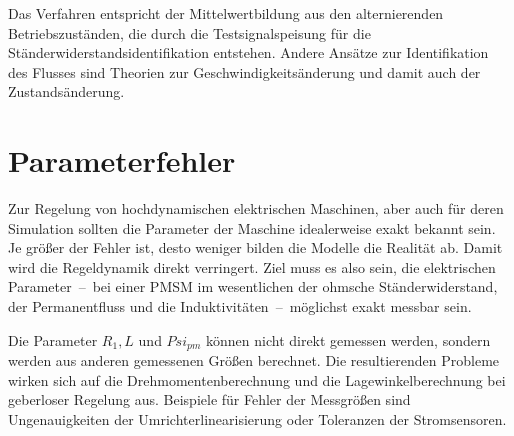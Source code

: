 \documentclass[conference,twocolumn]{IEEEtran}
\begin{document}
Das Verfahren entspricht der Mittelwertbildung aus den alternierenden Betriebszuständen, die durch die Testsignalspeisung für die Ständerwiderstandsidentifikation entstehen.
Andere Ansätze zur Identifikation des Flusses sind Theorien zur Geschwindigkeitsänderung und damit auch der Zustandsänderung.

\section{Parameterfehler}\label{sec:parameterfehler}

Zur Regelung von hochdynamischen elektrischen Maschinen, aber auch für deren Simulation sollten die Parameter der Maschine idealerweise exakt bekannt sein.
Je größer der Fehler ist, desto weniger bilden die Modelle die Realität ab.
Damit wird die Regeldynamik direkt verringert.
Ziel muss es also sein, die elektrischen Parameter~--~bei einer PMSM im wesentlichen der ohmsche Ständerwiderstand, der Permanentfluss und die Induktivitäten~--~möglichst exakt messbar sein.

Die Parameter $R_{1}, L$ und $Psi_{pm}$ können nicht direkt gemessen werden, sondern werden aus anderen gemessenen Größen berechnet.
Die resultierenden Probleme wirken sich auf die Drehmomentenberechnung und die Lagewinkelberechnung bei geberloser Regelung aus.
Beispiele für Fehler der Messgrößen sind Ungenauigkeiten der Umrichterlinearisierung oder Toleranzen der Stromsensoren.


%
%
\end{document}
